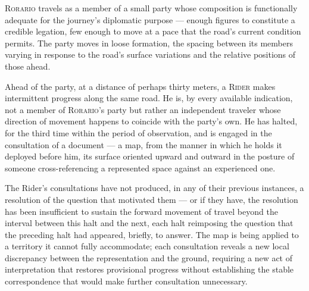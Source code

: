 \documentclass[12pt, oneside]{article}
\newenvironment{action}{%
  \vspace{0.6em}%
  \noindent\ignorespaces%
}{%
  \par\vspace{0.6em}%
}
\begin{document}
\begin{action}
\textsc{Rorario} travels as a member of a small party whose composition is functionally adequate for the journey's diplomatic purpose --- enough figures to constitute a credible legation, few enough to move at a pace that the road's current condition permits. The party moves in loose formation, the spacing between its members varying in response to the road's surface variations and the relative positions of those ahead.

Ahead of the party, at a distance of perhaps thirty meters, a \textsc{Rider} makes intermittent progress along the same road. He is, by every available indication, not a member of \textsc{Rorario}'s party but rather an independent traveler whose direction of movement happens to coincide with the party's own. He has halted, for the third time within the period of observation, and is engaged in the consultation of a document --- a map, from the manner in which he holds it deployed before him, its surface oriented upward and outward in the posture of someone cross-referencing a represented space against an experienced one.

The Rider's consultations have not produced, in any of their previous instances, a resolution of the question that motivated them --- or if they have, the resolution has been insufficient to sustain the forward movement of travel beyond the interval between this halt and the next, each halt reimposing the question that the preceding halt had appeared, briefly, to answer. The map is being applied to a territory it cannot fully accommodate; each consultation reveals a new local discrepancy between the representation and the ground, requiring a new act of interpretation that restores provisional progress without establishing the stable correspondence that would make further consultation unnecessary.
\end{action}
\end{document}
